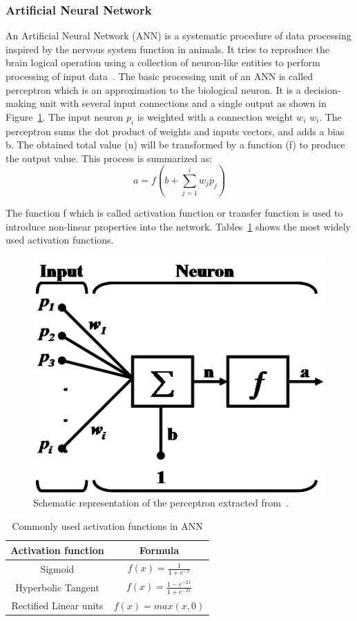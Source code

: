 \subsubsection{Artificial Neural Network}
An Artificial Neural Network (ANN) is a systematic procedure of data processing inspired by the nervous system function in animals. It tries to reproduce the brain logical operation using a collection of neuron-like entities to perform processing of input data~\cite{cortina2010analysis}. The basic processing unit of an ANN is called perceptron which is an approximation to the biological neuron. It is a decision-making unit with several input connections and a single output as shown in Figure~\ref{fig:perceptron}. The
input neuron $p_i$ is weighted with a connection weight $w_i$  $w_i$. The perceptron sums the dot product of weights and inputs vectors, and adds a bias b. The obtained total value (n) will be
transformed by a function (f) to produce the output value. This process is summarized as:
\begin{equation}
    a= f(b+ \sum_{j=1}^{i}{w_j p_j})
\end{equation}{}


The function f which is called activation function or transfer function is used to introduce non-linear properties into the network. Tables~\ref{tab:activation_func} shows the most widely used activation functions. 



\begin{figure}[h]
    \centering
    \includegraphics[width=.5\textwidth]{Figures/perceptron.png}
    \caption{Schematic representation of the perceptron extracted from~\cite{cortina2010analysis}.}
    \label{fig:perceptron}
\end{figure}



\begin{table}[h]
    \centering
\begin{tabular}{|c|c|}
\hline 
Activation function & Formula \tabularnewline
\hline 
Sigmoid & $f(x)= \frac{1}{1+ e^{-x}}$\tabularnewline
\hline 
Hyperbolic Tangent & $f(x)= \frac{1-e^{-2x}}{1+e^{-2x}}$\tabularnewline
\hline 
Rectified Linear units & $f(x)= max(x,0)$\tabularnewline
\hline 
\end{tabular}
    \caption{Commonly used activation functions in ANN}
    \label{tab:activation_func}
\end{table}



